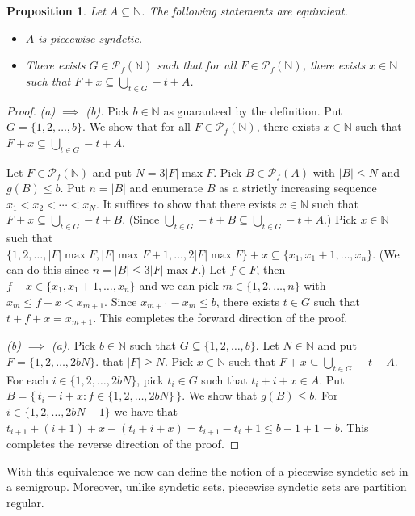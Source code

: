 \documentclass[12pt]{article}
\theoremstyle{plain}
\newtheorem{prop}[thm]{Proposition}
\theoremstyle{definition}
\newcommand{\bbN}{\mathbb{N}}
\newcommand{\Pf}{\mathcal{P}_f}
\begin{document}
\begin{prop}
  Let $A \subseteq \bbN$.
  The following statements are equivalent.
  \begin{itemize}
    \item[(a)] $A$ is piecewise syndetic.
    
    \item[(b)] There exists $G \in \Pf(\bbN)$ such that for all $F \in \Pf(\bbN)$, there exists $x \in \bbN$ such that $F+x \subseteq \bigcup_{t \in G} -t+A$. 
  \end{itemize}
\end{prop}
\begin{proof}
  \textsl{(a) $\implies$ (b).}
  Pick $b \in \bbN$ as guaranteed by the definition. 
  Put $G = \{1, 2, \ldots, b\}$.
  We show that for all $F \in \Pf(\bbN)$, there exists $x \in \bbN$ such that $F+x \subseteq \bigcup_{t \in G} -t + A$.

  Let $F \in \Pf(\bbN)$ and put $N = 3 |F| \max F$. 
  Pick $B \in \Pf(A)$ with $|B| \le N$ and $g(B) \le b$. 
  Put $n = |B|$ and enumerate $B$ as a strictly increasing sequence $x_1 < x_2 < \cdots  < x_N$.
  It suffices to show that there exists $x \in \bbN$ such that $F + x \subseteq \bigcup_{t \in G} -t + B$.
  (Since $\bigcup_{t \in G} -t + B \subseteq \bigcup_{t \in G} -t + A$.)
  Pick $x \in \bbN$ such that $\{1, 2, \ldots, |F| \max F, |F| \max F + 1, \ldots, 2|F| \max F\} + x \subseteq \{x_1, x_1 + 1, \ldots, x_n\}$.
  (We can do this since $n = |B| \le 3 |F| \max F$.)
  Let $f \in F$, then $f + x \in \{x_1, x_1 + 1, \ldots, x_n \}$ and we can pick $m \in \{1, 2, \ldots, n\}$ with $x_m \le f+x < x_{m+1}$. 
  Since $x_{m+1} - x_m \le b$, there exists $t \in G$ such that $t + f + x = x_{m+1}$. 
  This completes the forward direction of the proof.  
  
  \textsl{(b) $\implies$ (a).}
  Pick $b \in \bbN$ such that $G \subseteq \{1, 2, \ldots, b\}$. 
  Let $N \in \bbN$ and put $F = \{1, 2, \ldots, 2bN\}$. that $|F| \ge N$. 
  Pick $x \in \bbN$ such that $F + x \subseteq \bigcup_{t \in G} -t + A$. 
  For each $i \in \{1, 2, \ldots, 2bN\}$, pick $t_i \in G$ such that $t_i + i + x \in A$. 
  Put $B = \bigl\{\, t_i + i + x : f \in \{1, 2, \ldots, 2bN\} \,\bigr\}$. 
  We show that $g(B) \le b$. 
  For $i \in \{1, 2, \ldots, 2bN-1\}$ we have that $t_{i+1} + (i+1) + x - (t_i + i + x) = t_{i+1} - t_i + 1 \le b - 1 + 1 = b$.
  This completes the reverse direction of the proof.
\end{proof}
With this equivalence we now can define the notion of a piecewise
syndetic set in a semigroup. 
Moreover, unlike syndetic sets, piecewise syndetic sets are partition
regular.%
\end{document}
